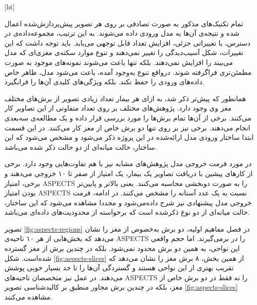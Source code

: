 
[ht]

تمام تکنیک‌های مذکور به صورت تصادفی بر روی هر تصویر پیش‌پردازش‌شده اعمال شده و نتیجه‌ی آن‌ها
به مدل ورودی داده می‌شوند.
به این ترتیب، مجموعه‌داده‌ی در دسترس، با تغییراتی جزئی، افزایش تعداد قابل توجهی می‌یابد.
باید توجه داشت که این تغییرات، شکل آسیب‌دیدگی را تغییر نمی‌دهند و تنوع موارد سکته‌ی مغزی‌ای که مدل می‌بیند را 
افزایش نمی‌دهند.
بلکه تنها باعث می‌شوند نمونه‌های موجود به صورت مطمئن‌تری فراگرفته شوند.
درواقع تنوع به‌وجود آمده، باعث می‌شود مدل، ظاهر خاص داده‌های ورودی را حفظ نکند. بلکه ویژگی‌های کلیدی آن‌ها را فرابگیرد.


همانطور که پیش‌تر ذکر شد، به ازای هر بیمار تعداد زیادی تصویر از برش‌های مختلف مغز وی وجود دارد.
پژوهش‌ها‌ی مختلف بر روی تعداد متفاوتی از این تصاویر کار می‌کنند.
برخی از آن‌ها تمام برش‌ها را مورد بررسی قرار داده و یک مطالعه‌ی سه‌بعدی انجام می‌دهند.
برخی نیز بر روی تنها دو برش خاص از مغز کار می‌کنند.
در این قسمت ابتدا ساختار ورودی مدل ارائه‌شده در این پروژه ذکر می‌شود
و مشخص می‌شود که
این ساختار، حالت میانه‌ای از دو حالت ذکر شده می‌باشد.

در مورد فرمت خروجی مدل پژوهش‌های مشابه نیز با هم تفاوت‌هایی وجود دارد.
برخی از کارهای پیشین با دریافت تصاویر یک بیمار، یک امتیاز از صفر تا ۱۰ خروجی می‌دهند و برخی، امتیاز ASPECTS را به صورت دوبخشی محاسبه می‌کنند.
یعنی بالاتر و پایین‌تر بودن امتیاز ASPECTS نسبت به یک عدد آستانه را مشخص می‌کنند.
در ادامه، فرمت خروجی مدل پیشنهادی نیز شرح داده‌می‌شود و
مجددا مشاهده می‌شود که این ساختار، حالت میانه‌ای از دو نوع ذکرشده است که برخواسته از محدودیت‌های داده‌ای می‌باشد.


تصویر \ref{fig:aspects-regions}
در فصل مفاهیم اولیه، دو برش به‌خصوص از مغز را نشان می‌دهد که بخش‌هایی از هر ۱۰ ناحیه‌ی ASPECTS را در برمی‌گیرند.
اما حجم واقعی این نواحی، به همین دو برش محدود نمی‌شود.
بلکه در چندین برش از مغز گسترده شده‌است.
شکل \ref{fig:aspects-slices}
از همین بخش، ۸ برش مغز را نشان می‌دهد که تقریب بهتری از این نواحی هستند و گستردگی آن‌ها را تا حد بسیار خوبی پوشش می‌دهند.
در عمل نیز متخصصان
ناحیه‌های ASPECTS را 
 نه فقط در دو برش خاص از مغز، بلکه 
 در چندین برش مجاور منطبق بر کالبدشناسی تصویر 
 \ref{fig:aspects-slices}
 مشاهده می‌کنند.

